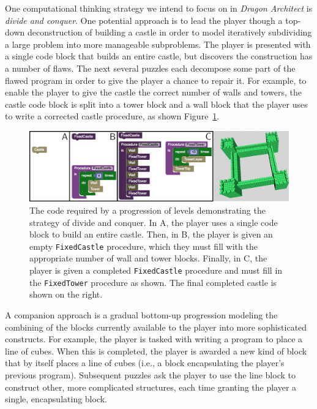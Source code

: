 \documentclass{sig-alternate}
\begin{document}
One computational thinking strategy we intend to focus on in \emph{Dragon Architect} is \emph{divide and conquer}.
One potential approach is to lead the player though a top-down deconstruction of building a castle in order to model iteratively subdividing a large problem into more manageable subproblems.
The player is presented with a single code block that builds an entire castle, but discovers the construction has a number of flaws. 
The next several puzzles each decompose some part of the flawed program in order to give the player a chance to repair it. 
For example, to enable the player to give the castle the correct number of walls and towers, the castle code block is split into a tower block and a wall block that the player uses to write a corrected castle procedure, as shown Figure~\ref{fig:decomp}. 

\begin{figure}[th!]
  \centering
  \includegraphics[width=\textwidth]{images/decomp-code}
  \caption{The code required by a progression of levels demonstrating the strategy of divide and conquer. In A, the player uses a single code block to build an entire castle. Then, in B, the player is given an empty \texttt{FixedCastle} procedure, which they must fill with the appropriate number of wall and tower blocks. Finally, in C, the player is given a completed \texttt{FixedCastle} procedure and must fill in the \texttt{FixedTower} procedure as shown. The final completed castle is shown on the right.}
  \label{fig:decomp}
\end{figure}

A companion approach is a gradual bottom-up progression modeling the combining of the blocks currently available to the player into more sophisticated constructs. 
For example, the player is tasked with writing a program to place a line of cubes. 
When this is completed, the player is awarded a new kind of block that by itself places a line of cubes (i.e., a block encapsulating the player's previous program). 
Subsequent puzzles ask the player to use the line block to construct other, more complicated structures, each time granting the player a single, encapsulating block.  
\end{document}
